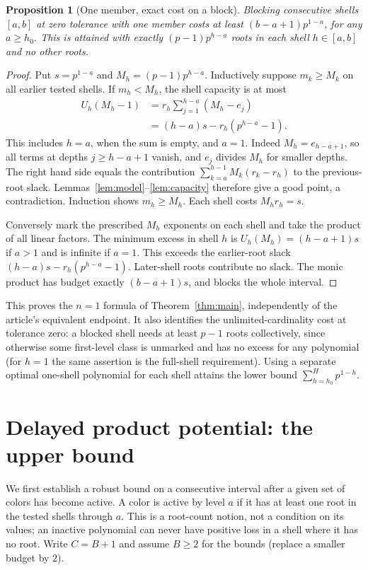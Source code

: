 \documentclass[11pt]{article}
\newtheorem{proposition}[theorem]{Proposition}
\theoremstyle{remark}\newtheorem{remark}[theorem]{Remark}
\begin{document}
\begin{proposition}[One member, exact cost on a block]\label{prop:one}
Blocking consecutive shells $[a,b]$ at zero tolerance with one member costs at least $(b-a+1)p^{1-a}$, for any $a\ge h_0$. This is attained with exactly $(p-1)p^{h-a}$ roots in each shell $h\in[a,b]$ and no other roots.
\end{proposition}
\begin{proof}
Put $s=p^{1-a}$ and $M_h=(p-1)p^{h-a}$. Inductively suppose $m_k\ge M_k$ on all earlier tested shells. If $m_h<M_h$, the shell capacity is at most
\begin{align*}
 U_h(M_h-1)&=r_h\sum_{j=1}^{h-a}(M_h-e_j)\\
 &=(h-a)s-r_h(p^{h-a}-1).
\end{align*}
This includes $h=a$, when the sum is empty, and $a=1$. Indeed $M_h=e_{h-a+1}$, so all terms at depths $j\ge h-a+1$ vanish, and $e_j$ divides $M_h$ for smaller depths. The right hand side equals the contribution $\sum_{k=a}^{h-1}M_k(r_k-r_h)$ to the previous-root slack. Lemmas~\ref{lem:model}--\ref{lem:capacity} therefore give a good point, a contradiction. Induction shows $m_h\ge M_h$. Each shell costs $M_hr_h=s$.

Conversely mark the prescribed $M_h$ exponents on each shell and take the product of all linear factors. The minimum excess in shell $h$ is $U_h(M_h)=(h-a+1)s$ if $a>1$ and is infinite if $a=1$. This exceeds the earlier-root slack $(h-a)s-r_h(p^{h-a}-1)$. Later-shell roots contribute no slack. The monic product has budget exactly $(b-a+1)s$, and blocks the whole interval.
\end{proof}
This proves the $n=1$ formula of Theorem~\ref{thm:main}, independently of the article's equivalent endpoint. It also identifies the unlimited-cardinality cost at tolerance zero: a blocked shell needs at least $p-1$ roots collectively, since otherwise some first-level class is unmarked and has no excess for any polynomial (for $h=1$ the same assertion is the full-shell requirement). Using a separate optimal one-shell polynomial for each shell attains the lower bound $\sum_{h=h_0}^H p^{1-h}$.

\section{Delayed product potential: the upper bound}\label{sec:upper}
We first establish a robust bound on a consecutive interval after a given set of colors has become active. A color is active by level $a$ if it has at least one root in the tested shells through $a$. This is a root-count notion, not a condition on its values; an inactive polynomial can never have positive loss in a shell where it has no root. Write $C=B+1$ and assume $B\ge2$ for the bounds (replace a smaller budget by 2).
\end{document}
